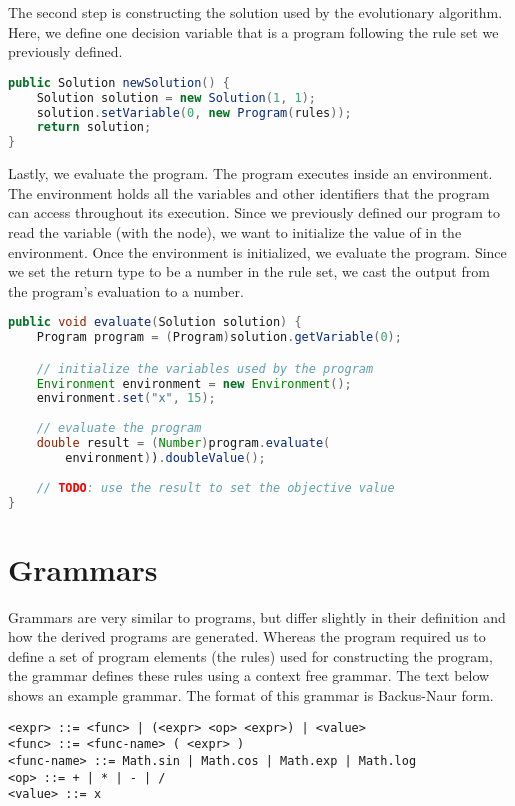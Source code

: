 The second step is constructing the solution used by the evolutionary algorithm.  Here, we define one decision variable that is a program following the rule set we previously defined.
\begin{lstlisting}[language=Java]
public Solution newSolution() {
    Solution solution = new Solution(1, 1);
    solution.setVariable(0, new Program(rules));
    return solution;
}
\end{lstlisting}

Lastly, we evaluate the program.  The program executes inside an environment.  The environment holds all the variables and other identifiers that the program can access throughout its execution.  Since we previously defined our program to read the variable  (with the  node), we want to initialize the value of  in the environment.  Once the environment is initialized, we evaluate the program.  Since we set the return type to be a number in the rule set, we cast the output from the program's evaluation to a number.
\begin{lstlisting}[language=Java]
public void evaluate(Solution solution) {
    Program program = (Program)solution.getVariable(0);

    // initialize the variables used by the program
    Environment environment = new Environment();
    environment.set("x", 15);
    
    // evaluate the program
    double result = (Number)program.evaluate(
        environment)).doubleValue();
        
    // TODO: use the result to set the objective value
}
\end{lstlisting}

\section{Grammars}
Grammars are very similar to programs, but differ slightly in their definition and how the derived programs are generated.  Whereas the program required us to define a set of program elements (the rules) used for constructing the program, the grammar defines these rules using a context free grammar.  The text below shows an example grammar.  The format of this grammar is Backus-Naur form.
\begin{lstlisting}[language=Plaintext]
<expr> ::= <func> | (<expr> <op> <expr>) | <value>
<func> ::= <func-name> ( <expr> )
<func-name> ::= Math.sin | Math.cos | Math.exp | Math.log
<op> ::= + | * | - | /
<value> ::= x
\end{lstlisting}

